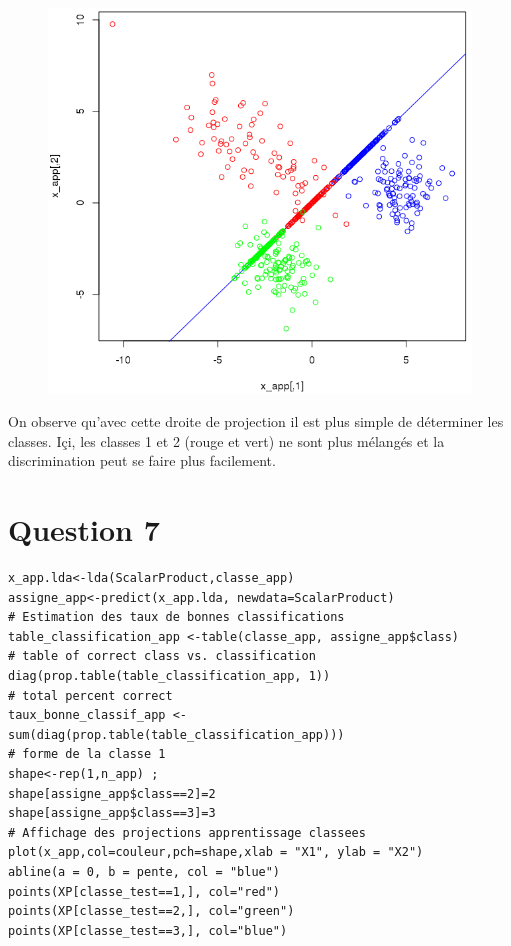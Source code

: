 \documentclass[a4paper,12pt]{report}
\begin{document}
\begin{figure}[!ht]
	\center
	\includegraphics[scale=0.4]{image/q6.png}
\end{figure}

On observe qu'avec cette droite de projection il est plus simple de déterminer les classes. Içi, les classes 1 et 2 (rouge et vert) ne sont plus mélangés et la discrimination peut se faire plus facilement.

\newpage

\section*{Question 7}

\begin{lstlisting}
x_app.lda<-lda(ScalarProduct,classe_app)
assigne_app<-predict(x_app.lda, newdata=ScalarProduct)
# Estimation des taux de bonnes classifications
table_classification_app <-table(classe_app, assigne_app$class)
# table of correct class vs. classification
diag(prop.table(table_classification_app, 1))
# total percent correct
taux_bonne_classif_app <-sum(diag(prop.table(table_classification_app)))
# forme de la classe 1
shape<-rep(1,n_app) ;
shape[assigne_app$class==2]=2
shape[assigne_app$class==3]=3
# Affichage des projections apprentissage classees
plot(x_app,col=couleur,pch=shape,xlab = "X1", ylab = "X2")
abline(a = 0, b = pente, col = "blue")
points(XP[classe_test==1,], col="red")
points(XP[classe_test==2,], col="green")
points(XP[classe_test==3,], col="blue")
\end{lstlisting}
\end{document}
